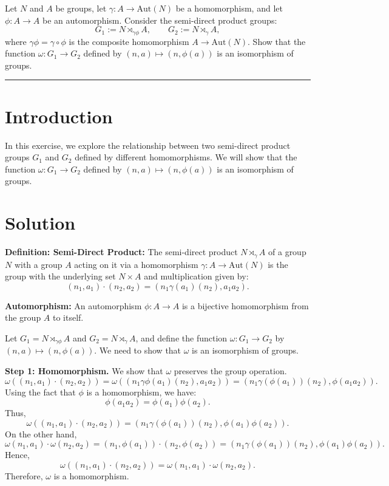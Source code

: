 \documentclass[12pt]{amsart}
\theoremstyle{definition}
\numberwithin{equation}{section}
\begin{document}
\begin{exercise}{4} Let \(N\) and \(A\) be groups, let \(\gamma : A \rightarrow \text{Aut}(N)\) be a homomorphism, and let \(\phi : A \rightarrow A\) be an automorphism. Consider the semi-direct product groups: \[G_1 := N \rtimes_{\gamma \phi}A, \qquad G_2 := N \rtimes_{\gamma}A, \] where \(\gamma\phi = \gamma \circ \phi \) is the composite homomorphism \(A \rightarrow \text{Aut}(N)\). Show that the function \(\omega : G_1 \rightarrow G_2\) defined by \((n,a) \mapsto (n, \phi(a))\) is an isomorphism of groups.

    \noindent\rule{\linewidth}{1pt}

    \section*{Introduction}
    
    In this exercise, we explore the relationship between two semi-direct product groups \(G_1\) and \(G_2\) defined by different homomorphisms. We will show that the function \(\omega : G_1 \rightarrow G_2\) defined by \((n,a) \mapsto (n, \phi(a))\) is an isomorphism of groups.

    \section*{Solution}
    
    \noindent \textbf{Definition: Semi-Direct Product:} The semi-direct product \(N \rtimes_{\gamma} A\) of a group \(N\) with a group \(A\) acting on it via a homomorphism \(\gamma : A \rightarrow \text{Aut}(N)\) is the group with the underlying set \(N \times A\) and multiplication given by:
    \[
    (n_1, a_1) \cdot (n_2, a_2) = (n_1 \gamma(a_1)(n_2), a_1 a_2).
    \]

    \noindent \textbf{Automorphism:} An automorphism \(\phi: A \to A\) is a bijective homomorphism from the group \(A\) to itself.

    Let \(G_1 = N \rtimes_{\gamma \phi} A\) and \(G_2 = N \rtimes_{\gamma} A\), and define the function \(\omega : G_1 \rightarrow G_2\) by \((n, a) \mapsto (n, \phi(a))\). We need to show that \(\omega \) is an isomorphism of groups.

    \noindent \textbf{Step 1: Homomorphism.} We show that \(\omega \) preserves the group operation.
    \[
    \omega((n_1, a_1) \cdot (n_2, a_2)) = \omega((n_1 \gamma\phi(a_1)(n_2), a_1 a_2)) = (n_1 \gamma(\phi(a_1))(n_2), \phi(a_1 a_2)).
    \]
    Using the fact that \(\phi \) is a homomorphism, we have:
    \[
    \phi(a_1 a_2) = \phi(a_1)\phi(a_2).
    \]
    Thus,
    \[
    \omega((n_1, a_1) \cdot (n_2, a_2)) = (n_1 \gamma(\phi(a_1))(n_2), \phi(a_1)\phi(a_2)).
    \]
    On the other hand,
    \[
    \omega(n_1, a_1) \cdot \omega(n_2, a_2) = (n_1, \phi(a_1)) \cdot (n_2, \phi(a_2)) = (n_1 \gamma(\phi(a_1))(n_2), \phi(a_1) \phi(a_2)).
    \]
    Hence,
    \[
    \omega((n_1, a_1) \cdot (n_2, a_2)) = \omega(n_1, a_1) \cdot \omega(n_2, a_2).
    \]
    Therefore, \(\omega \) is a homomorphism.


\end{exercise}
\end{document}

